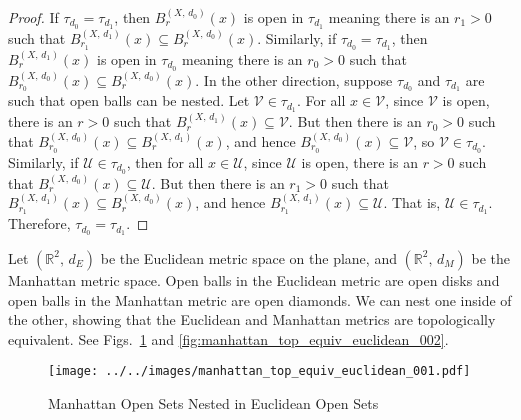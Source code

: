 \documentclass{article}
\theoremstyle{plain}
\theoremstyle{normal}
\newenvironment{example}{%
    \pushQED{\qed}\renewcommand{\qedsymbol}{$\blacksquare$}\examplex%
}{%
    \popQED\endexamplex%
}
\begin{document}
        \begin{proof}
            If $\tau_{d_{0}}=\tau_{d_{1}}$, then
            $B_{r}^{(X,\,d_{0})}(x)$ is open in
            $\tau_{d_{1}}$ meaning there is an $r_{1}>0$ such that
            $B_{r_{1}}^{(X,\,d_{1})}(x)\subseteq{B}_{r}^{(X,\,d_{0})}(x)$.
            Similarly, if $\tau_{d_{0}}=\tau_{d_{1}}$, then
            $B_{r}^{(X,\,d_{1})}(x)$ is open in
            $\tau_{d_{0}}$ meaning there is an $r_{0}>0$ such that
            $B_{r_{0}}^{(X,\,d_{0})}(x)\subseteq{B}_{r}^{(X,\,d_{0})}(x)$.
            In the other direction, suppose $\tau_{d_{0}}$ and
            $\tau_{d_{1}}$ are such that open balls can be nested.
            Let $\mathcal{V}\in\tau_{d_{1}}$. For all
            $x\in\mathcal{V}$, since $\mathcal{V}$ is open, there is an
            $r>0$ such that $B_{r}^{(X,\,d_{1})}(x)\subseteq\mathcal{V}$.
            But then there is an $r_{0}>0$ such that
            $B_{r_{0}}^{(X,\,d_{0})}(x)\subseteq{B}_{r}^{(X,\,d_{1})}(x)$, and
            hence
            $B_{r_{0}}^{(X,\,d_{0})}(x)\subseteq\mathcal{V}$, so
            $\mathcal{V}\in\tau_{d_{0}}$. Similarly, if
            $\mathcal{U}\in\tau_{d_{0}}$, then for all $x\in\mathcal{U}$, since
            $\mathcal{U}$ is open, there is an $r>0$ such that
            $B_{r}^{(X,\,d_{0})}(x)\subseteq\mathcal{U}$. But then there is
            an $r_{1}>0$ such that
            $B_{r_{1}}^{(X,\,d_{1})}(x)\subseteq{B}_{r}^{(X,\,d_{0})}(x)$, and
            hence $B_{r_{1}}^{(X,\,d_{1})}(x)\subseteq\mathcal{U}$. That is,
            $\mathcal{U}\in\tau_{d_{1}}$. Therefore,
            $\tau_{d_{0}}=\tau_{d_{1}}$.
        \end{proof}
        \begin{example}
            Let $(\mathbb{R}^{2},\,d_{E})$ be the Euclidean metric space on the
            plane, and $(\mathbb{R}^{2},\,d_{M})$ be the Manhattan metric space.
            Open balls in the Euclidean metric are open disks and open balls
            in the Manhattan metric are open diamonds. We can nest one inside
            of the other, showing that the Euclidean and Manhattan metrics are
            topologically equivalent.
            See Figs.~\ref{fig:manhattan_top_equiv_euclidean_001}
            and \ref{fig:manhattan_top_equiv_euclidean_002}.
        \end{example}
        \begin{figure}
            \centering
            \texttt{[image: ../../images/manhattan\_top\_equiv\_euclidean\_001.pdf]}
            \caption{Manhattan Open Sets Nested in Euclidean Open Sets}
            \label{fig:manhattan_top_equiv_euclidean_001}
        \end{figure}
\end{document}
